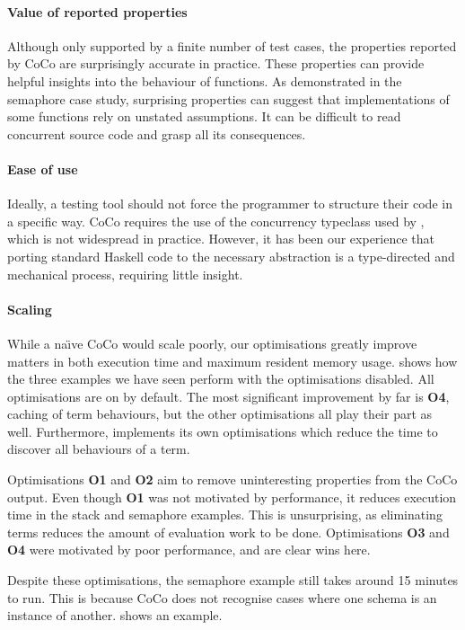 \paragraph{Value of reported properties}
Although only supported by a finite number of test cases, the
properties reported by CoCo are surprisingly accurate in practice.
These properties can provide helpful insights into the behaviour of
functions.  As demonstrated in the semaphore case study, surprising
properties can suggest that implementations of some functions rely on
unstated assumptions.  It can be difficult to read concurrent source
code and grasp all its consequences.

\paragraph{Ease of use}
Ideally, a testing tool should not force the programmer to structure
their code in a specific way.  CoCo requires the use of the
concurrency typeclass used by \dejafu{}, which is not widespread in
practice.  However, it has been our experience that porting standard
Haskell code to the necessary abstraction is a type-directed and
mechanical process, requiring little insight.

\paragraph{Scaling}
While a na\"{\i}ve CoCo would scale poorly, our optimisations greatly
improve matters in both execution time and maximum resident memory
usage.   shows how the three examples we have
seen perform with the optimisations disabled.  All optimisations are
on by default.  The most significant improvement by far is
\textbf{O4}, caching of term behaviours, but the other optimisations
all play their part as well.  Furthermore, \dejafu{} implements its
own optimisations which reduce the time to discover all behaviours of
a term.

Optimisations \textbf{O1} and \textbf{O2} aim to remove uninteresting
properties from the CoCo output.  Even though \textbf{O1} was not
motivated by performance, it reduces execution time in the stack and
semaphore examples.  This is unsurprising, as eliminating terms
reduces the amount of evaluation work to be done.  Optimisations
\textbf{O3} and \textbf{O4} were motivated by poor performance, and
are clear wins here.

Despite these optimisations, the semaphore example still takes around
15 minutes to run.  This is because CoCo does not recognise cases
where one schema is an instance of another.  
shows an example.

